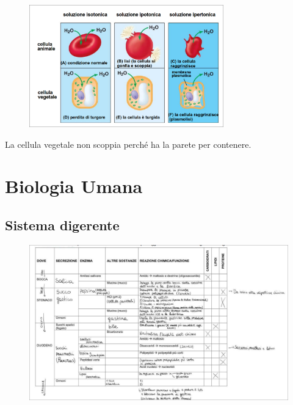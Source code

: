 \documentclass[a4paper]{article}
\begin{document}

\begin{figure}[th]
    \centering
    \includegraphics[width=0.75\textwidth]{./equilibrio_idrico.png}
\end{figure}

La cellula vegetale non scoppia perché ha la parete per contenere.

\pagebreak

\section{Biologia Umana}

\subsection{Sistema digerente}


\begin{figure}[th]
    \centering
    \includegraphics[width=\textwidth]{./tabella.png}
\end{figure}
\end{document}
